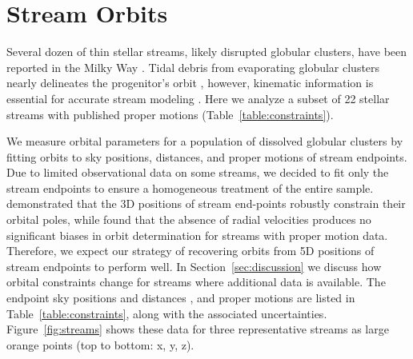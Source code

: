 \documentclass[twocolumn]{aastex63}
\newcommand{\package}[1]{\textsl{#1}}
\begin{document}
\section{Stream Orbits}
\label{sec:orbits}

Several dozen of thin stellar streams, likely disrupted globular clusters, have been reported in the Milky Way \citep[an up-to-date list is available in the \package{galstreams} package,][]{mateu:2018}.
Tidal debris from evaporating globular clusters nearly delineates the progenitor's orbit \citep[e.g.,][]{kupper:2012}, however, kinematic information is essential for accurate stream modeling \citep{bh:2018}.
Here we analyze a subset of 22 stellar streams with published proper motions (Table~\ref{table:constraints}).

We measure orbital parameters for a population of dissolved globular clusters by fitting orbits to sky positions, distances, and proper motions of stream endpoints.
Due to limited observational data on some streams, we decided to fit only the stream endpoints to ensure a homogeneous treatment of the entire sample.
\citet{riley:2020} demonstrated that the 3D positions of stream end-points robustly constrain their orbital poles, while \citet{ibata:2019} found that the absence of radial velocities produces no significant biases in orbit determination for streams with proper motion data.
Therefore, we expect our strategy of recovering orbits from 5D positions of stream endpoints to perform well.
In Section~\ref{sec:discussion} we discuss how orbital constraints change for streams where additional data is available.
The endpoint sky positions and distances \citep{riley:2020}, and proper motions \citep[][as noted]{ibata:2019, shipp:2019} are listed in Table~\ref{table:constraints}, along with the associated uncertainties.
Figure~\ref{fig:streams} shows these data for three representative streams as large orange points (top to bottom: x, y, z).
\end{document}
